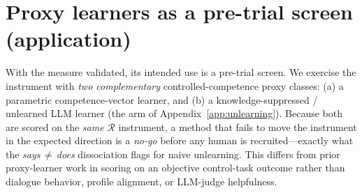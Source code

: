 \documentclass{article}
\newcommand{\regret}{\mathcal{R}}
\begin{document}
\section{Proxy learners as a pre-trial screen (application)}
\label{app:proxies}
\label{sec:proxies}
With the measure validated, its intended use is a pre-trial screen. We exercise the instrument with
\emph{two complementary} controlled-competence proxy classes: (a) a parametric competence-vector
learner, and (b) a knowledge-suppressed / unlearned LLM learner (the arm of
Appendix~\ref{app:unlearning}). Because both are scored on the \emph{same} $\regret$ instrument, a
method that fails to move the instrument in the expected direction is a \emph{no-go} before any human
is recruited---exactly what the \emph{says\,$\neq$\,does} dissociation flags for naive unlearning. This
differs from prior proxy-learner work
\citep{apartsin2026,ps2_2026,song2026unlearn,llmjudgeaudit2026,educlaw2026} in scoring on an objective
control-task outcome rather than dialogue behavior, profile alignment, or LLM-judge helpfulness.

\small


\end{document}
